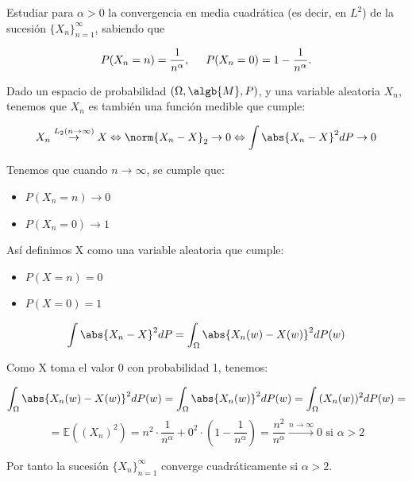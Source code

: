 
\begin{problem}[14] Estudiar para $ \alpha>0 $ la convergencia en
media cuadr\'atica (es decir, en $L^2$) de la sucesi\'on $\{X_n\}_{n=1}^\infty$, sabiendo que

\[  P(X_n=n)=\frac{1}{n^\alpha}, \hspace{5mm} P(X_n=0)=1-\frac{1}{n^\alpha}.
  \]
\solution

\begin{expla}
Dado un espacio de probabilidad $(\Omega, \algb{M}, P)$, y una variable aleatoria $X_n$, tenemos que $X_n$ es también una función medible que cumple:

\[
X_n \stackrel{L_2 (n\rightarrow \infty)}{\rightarrow} X \Leftrightarrow \norm{X_n -X}_2  \rightarrow 0 \Leftrightarrow \int{\abs{X_n -X}^2dP} \rightarrow 0
\]

Tenemos que cuando $n \rightarrow \infty$, se cumple que:
\begin{itemize}
\item $P(X_n = n) \rightarrow 0$
\item $P(X_n = 0) \rightarrow 1$
\end{itemize}

Así definimos X como una variable aleatoria que cumple:

\begin{itemize}
\item $P(X = n) = 0$
\item $P(X = 0) = 1$
\end{itemize}

\end{expla}

\[
\int{\abs{X_n -X}^2dP} = \int_{\Omega}{\abs{X_n(w) -X(w)}^2dP(w)}
\]

Como X toma el valor 0 con probabilidad 1, tenemos:

\[
\int_{\Omega}\abs{X_n(w) -X(w)}^2dP(w)=\int_{\Omega}\abs{X_n(w)}^2dP(w)=\int_{\Omega}(X_n(w))^2dP(w) =
\]
\[
=\mathbb{E}((X_n)^2)=n^2\cdot\frac{1}{n^{\alpha}}+0^2\cdot(1-\frac{1}{n^{\alpha}})=\frac{n^2}{n^{\alpha}} \stackrel{n \rightarrow \infty}{\rightarrow} 0 \text{ si } \alpha>2 
\]

Por tanto la sucesión $\{X_n\}_{n=1}^\infty$ converge cuadráticamente si $\alpha > 2$.



\end{problem}

